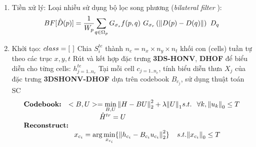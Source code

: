 \begin{algorithm}
\begin{algorithmic}
	\Operation \\	
	\begin{enumerate}		
		\item Tiền xử lý: Loại nhiễu sử dụng bộ lọc song phương (\textit{bilateral filter} \cite{camplani_jbf}): 
			\begin{equation}
			BF[\hat D(p)] = \frac{1}{{W_p}} {\sum\limits_{q \in {\Omega _p}} G_{\sigma_s} f(p,q) \hspace{0.05in}G_{\sigma_r} \left( {\left\| {D(p) - D(q)} \right\|} \right) \hspace{0.05in}D_q}
			\end{equation}
		\item Khởi tạo: $class = [\hspace{0.05in}]$
			\State Chia $S^{te}_i$ thành $n_c = n_x\times n_y\times n_t$ khối con (cells) tuần tự theo các trục $x,y,t$			
			\State Rút và kết hợp đặc trưng \textbf{3DS-HONV}, \textbf{DHOF} để biểu diễn cho từng cells: \(h^{te}_{j=1..n_c}\)
			\State Tại mỗi cell $c_{j=1..n_c}$, tính biểu diễn thưa $X_j$ của đặc trưng \textbf{3DSHONV-DHOF} dựa trên codebook $B_{c_j}$, sử dụng thuật toán SC\cite{Andrew_sparse_coding}
			\begin{equation}
			\begin{array}{l}
			\textbf{Codebook:}\hspace{0.1in} < B,U > = \mathop {\min }\limits_{B,U} \left\| {H - BU} \right\|_2^2 + \lambda {\left\| U \right\|_1} s.t.\hspace{0.1in}\forall k,{\left\| {{u_k}} \right\|_0} \le T \\
			\hspace{1.5in} \hat H^{tr} = U \\
			 \textbf{Reconstruct:}\\
			 \hspace{1in} {x_{c_i}} = \arg \mathop {\min }\limits_{{x_{c_i}}} \{ \left\| {{h_{c_i}} - B_{c_i}{u_{c_i}}} \right\|_2^2\} \hspace{0.15in} s.t.{\left\| {{x_{c_i}}} \right\|_0} \le T
			 \end{array}
			\end{equation}

\end{enumerate}
\end{algorithmic}
\end{algorithm}
